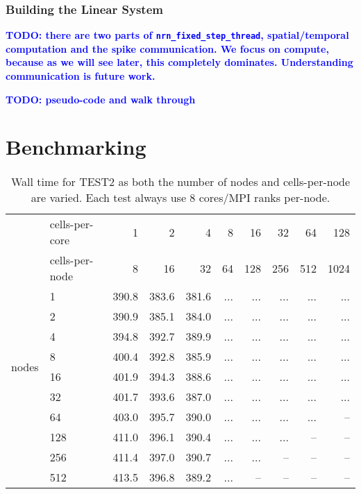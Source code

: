 \documentclass[11pt,a4paper]{article}
\newcommand{\todo}[1]{\textbf{\textcolor{Blue}{TODO: #1}}} %
\newcommand{\lst}[1]{\lstinline!#1!} %
\begin{document}
\subsubsection{Building the Linear System}
\todo{there are two parts of \lst{nrn_fixed_step_thread}, spatial/temporal computation and the spike communication. We focus on compute, because as we will see later, this completely dominates. Understanding communication is future work.}

\todo{pseudo-code and walk through}

\section{Benchmarking}
\begin{table}[htp!]
    \centering
\begin{tabular}{l|l|rrrrrrrr}
\multirow{2}{*}{}
& cells-per-core  &    1  & 2     & 4     & 8  & 16  & 32  & 64  & 128 \\
& cells-per-node  &    8  & 16    & 32    & 64 & 128 & 256 & 512 & 1024 \\
\hline
\multirow{8}{*}{nodes}
&1                & 390.8 & 383.6 & 381.6 & ... & ... & ... & ... & ... \\
&2                & 390.9 & 385.1 & 384.0 & ... & ... & ... & ... & ... \\
&4                & 394.8 & 392.7 & 389.9 & ... & ... & ... & ... & ... \\
&8                & 400.4 & 392.8 & 385.9 & ... & ... & ... & ... & ... \\
&16               & 401.9 & 394.3 & 388.6 & ... & ... & ... & ... & ... \\
&32               & 401.7 & 393.6 & 387.0 & ... & ... & ... & ... & ... \\
&64               & 403.0 & 395.7 & 390.0 & ... & ... & ... & ... & --  \\
&128              & 411.0 & 396.1 & 390.4 & ... & ... & ... & --  & --  \\
&256              & 411.4 & 397.0 & 390.7 & ... & ... & --  & --  & --  \\
&512              & 413.5 & 396.8 & 389.2 & ... & --  & --  & --  & --  \\
\end{tabular}
\label{tbl:test2scaling}
\caption{Wall time for TEST2 as both the number of nodes and cells-per-node are varied. Each test always use 8 cores/MPI ranks per-node.}
\end{table}
\end{document}
